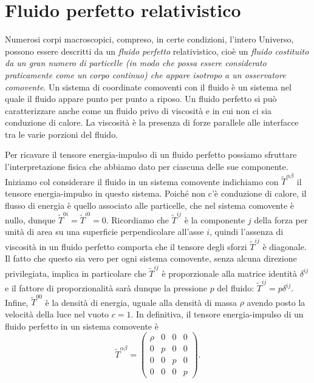 \section{Fluido perfetto relativistico}
\label{sec:fluido-perfetto}

Numerosi corpi macroscopici, compreso, in certe condizioni, l'intero Universo,
possono essere descritti da un \emph{fluido perfetto}
relativistico, cioè un
\emph{fluido costituito da un gran numero di particelle (in modo che possa
  essere considerato praticamente come un corpo continuo) che appare isotropo a
  un osservatore comovente}.
Un sistema di coordinate comoventi con il fluido è un sistema nel quale il
fluido appare punto per punto a riposo.  Un fluido perfetto si può
caratterizzare anche come un fluido privo di viscosità e in cui non ci sia
conduzione di calore.  La viscosità è la presenza di forze parallele alle
interfacce tra le varie porzioni del fluido.

Per ricavare il tensore energia-impulso di un fluido perfetto possiamo sfruttare
l'interpretazione fisica che abbiamo dato per ciascuna delle sue componente.
Iniziamo col considerare il fluido in un sistema comovente indichiamo con
$\tilde T^{\alpha\beta}$ il tensore energia-impulso in questo sistema.  Poiché
non c'è conduzione di calore, il flusso di energia è quello associato alle
particelle, che nel sistema comovente è nullo, dunque
$\tilde T^{0i} = \tilde T^{i0} = 0$.  Ricordiamo che $\tilde T^{ij}$ è la
componente $j$ della forza per unità di area su una superficie perpendicolare
all'asse $i$, quindi l'assenza di viscosità in un fluido perfetto comporta che
il tensore degli sforzi $\tilde T^{ij}$ è diagonale.  Il fatto che questo sia
vero per ogni sistema comovente, senza alcuna direzione privilegiata, implica in
particolare che $\tilde T^{ij}$ è proporzionale alla matrice identità
$\delta^{ij}$ e il fattore di proporzionalità sarà dunque la pressione $p$ del
fluido: $\tilde T^{ij} = p \delta^{ij}$.  Infine, $\tilde T^{00}$ è la densità
di energia, uguale alla densità di massa $\rho$ avendo posto la velocità della
luce nel vuoto $c = 1$.  In definitiva, il tensore energia-impulso di un fluido
perfetto in un sistema comovente è
\begin{equation}
  \tilde T^{\alpha\beta} =
  \begin{pmatrix}
    \rho & 0 & 0 & 0 \\
    0    & p & 0 & 0 \\
    0    & 0 & p & 0 \\
    0    & 0 & 0 & p
  \end{pmatrix}.
\end{equation}

